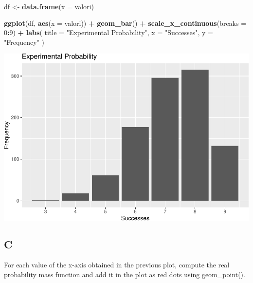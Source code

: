 \documentclass[
]{article}
\newenvironment{Shaded}{\begin{snugshade}}{\end{snugshade}}
\newcommand{\DataTypeTok}[1]{\textcolor[rgb]{0.13,0.29,0.53}{#1}}
\newcommand{\DecValTok}[1]{\textcolor[rgb]{0.00,0.00,0.81}{#1}}
\newcommand{\KeywordTok}[1]{\textcolor[rgb]{0.13,0.29,0.53}{\textbf{#1}}}
\newcommand{\NormalTok}[1]{#1}
\newcommand{\OperatorTok}[1]{\textcolor[rgb]{0.81,0.36,0.00}{\textbf{#1}}}
\newcommand{\StringTok}[1]{\textcolor[rgb]{0.31,0.60,0.02}{#1}}
\begin{document}
\begin{Shaded}
\begin{Highlighting}[]
\NormalTok{df \textless{}{-}}\StringTok{ }\KeywordTok{data.frame}\NormalTok{(}\DataTypeTok{x =}\NormalTok{ valori)}

\KeywordTok{ggplot}\NormalTok{(df, }\KeywordTok{aes}\NormalTok{(}\DataTypeTok{x =}\NormalTok{ valori)) }\OperatorTok{+}
\StringTok{  }\KeywordTok{geom\_bar}\NormalTok{() }\OperatorTok{+}
\StringTok{  }\KeywordTok{scale\_x\_continuous}\NormalTok{(}\DataTypeTok{breaks =} \DecValTok{0}\OperatorTok{:}\DecValTok{9}\NormalTok{) }\OperatorTok{+}
\StringTok{  }\KeywordTok{labs}\NormalTok{(}
    \DataTypeTok{title =} \StringTok{"Experimental Probability"}\NormalTok{,}
    \DataTypeTok{x =} \StringTok{"Successes"}\NormalTok{,}
    \DataTypeTok{y =} \StringTok{"Frequency"}
\NormalTok{  )}
\end{Highlighting}
\end{Shaded}

\includegraphics{es_files/figure-latex/unnamed-chunk-14-1.pdf}

\hypertarget{c}{%
\subsection{C}\label{c}}

For each value of the x-axis obtained in the previous plot, compute the
real probability mass function and add it in the plot as red dots using
geom\_point().
\end{document}
